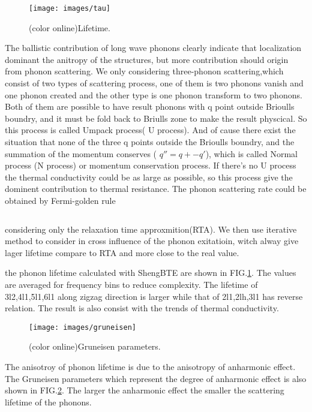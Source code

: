 \documentclass[%
 reprint,
 amsmath,amssymb,
 aps,
 prb,
]{revtex4-1}
\begin{document}
\begin{figure}[b]
  \texttt{[image: images/tau]}
  \caption{\label{fig:tau} (color online)Lifetime.}
\end{figure}

The ballistic contribution of long wave phonons clearly indicate that localization dominant the anitropy of the structures, but more contribution should origin from phonon scattering. We only considering three-phonon scattering,which consist of two types of scattering process, one of them is two phonons vanish and one phonon created and the other type is one phonon transform to two phonons. Both of them are possible to have result phonons with q point outside Brioulls boundry, and it must be fold back to Briulls zone to make the result physcical. So this process is called Umpack process( U process). And of cause there exist the situation that none of the three q points outside the Brioulls boundry, and the summation of the momentum conserves ( $q''=q+-q'$), which is called Normal process (N process) or momentum conservation process. If there's no U process the thermal conductivity could be as large as possible, so this process give the dominent contribution to thermal resistance. The phonon scattering rate could be obtained by Fermi-golden rule 

\begin{equation}
\end{equation}

considering only the relaxation time approxmition(RTA). We then use iterative method to consider in cross influence of the phonon exitatioin, witch alway give lager lifetime compare to RTA and more close to the real value.

the phonon lifetime calculated with ShengBTE\cite{Li2014} are shown in FIG.\ref{fig:tau}. The values are averaged for frequency bins to reduce complexity. The lifetime of 3l2,4l1,5l1,6l1 along zigzag direction is larger while that of 2l1,2lh,3l1 has reverse relation. The result is also consist with the trends of thermal conductivity.

\begin{figure}[b]
  \texttt{[image: images/gruneisen]}
  \caption{\label{fig:gruneisen} (color online)Gruneisen parameters.}
\end{figure}

The anisotroy of phonon lifetime is due to the anisotropy of anharmonic effect. The Gruneisen parameters which represent the degree of anharmonic effect is also shown in FIG.\ref{fig:gruneisen}.
The larger the anharmonic effect the smaller the scattering lifetime of the phonons.
\end{document}
